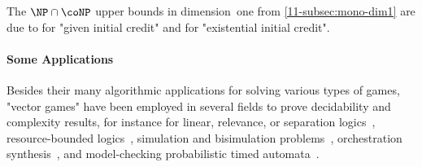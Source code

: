 The $\NP\cap\coNP$ upper bounds in dimension~one from
\cref{11-subsec:mono-dim1} are due to  for "given
initial credit" and  for "existential initial credit".

\paragraph{Some Applications}
Besides their many algorithmic applications for solving various types
of games, "vector games" have been employed in several fields to prove
decidability and complexity results, for instance for linear,
relevance, or separation
logics~\cite{Lincoln&Mitchell&Scedrov&Shankar:1992,Kanovich:1995,Urquhart:1999,Larchey&Galmiche:2013,Brotherston&Kanovich:2014,Kanovich:2016},
resource-bounded logics~\cite{Alechina&al:2018}, simulation and
bisimulation
problems~\cite{Kiefer:2013,Abdulla&al:2013,Courtois&Schmitz:2014,Jancar&Osicka&Sawa:2018},
orchestration synthesis~\cite{DeGiacomo&Vardi&Felli&Alechina&Logan:2018},
and model-checking probabilistic timed
automata~\cite{Jurdzinski&Laroussinie&Sproston:2008}.


